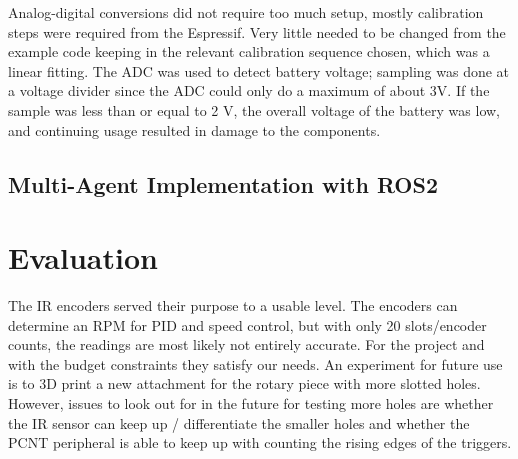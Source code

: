 \documentclass[conference]{IEEEtran}
\begin{document}
 Analog-digital conversions did not require too much setup, mostly calibration steps were required from the Espressif. Very little needed to be changed from the example code keeping in the relevant calibration sequence chosen, which was a linear fitting. The ADC was used to detect battery voltage; sampling was done at a voltage divider since the ADC could only do a maximum of about 3V. If the sample was less than or equal to 2 V, the overall voltage of the battery was low, and continuing usage resulted in damage to the components.
 
 
\subsection{Multi-Agent Implementation with ROS2}

\section{Evaluation}
The IR encoders served their purpose to a usable level. The encoders can determine an RPM for PID and speed control, but with only 20 slots/encoder counts, the readings are most likely not entirely accurate. For the project and with the budget constraints they satisfy our needs. An experiment for future use is to 3D print a new attachment for the rotary piece with more slotted holes. However, issues to look out for in the future for testing more holes are whether the IR sensor can keep up / differentiate the smaller holes and whether the PCNT peripheral is able to keep up with counting the rising edges of the triggers.
\end{document}
